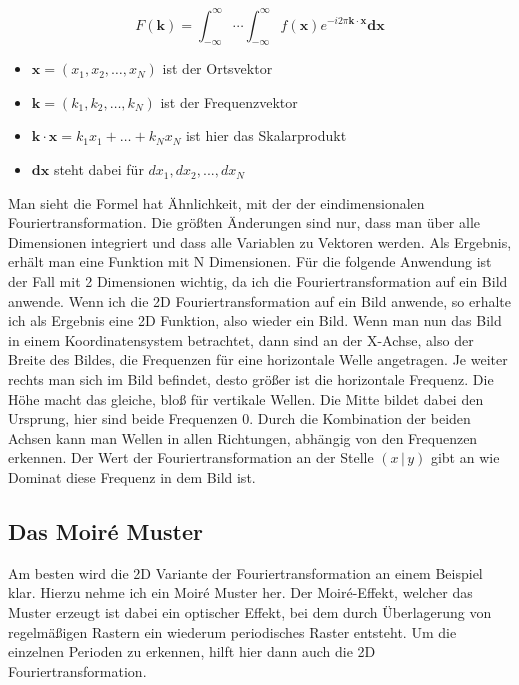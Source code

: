 \documentclass[a4paper,12pt]{article}
\theoremstyle{definition}
\theoremstyle{remark}
\begin{document}
$$F(\mathbf{k}) = \int_{-\infty}^{\infty} \cdots \int_{-\infty}^{\infty} {f(\mathbf{x}) e^{-i2\pi \mathbf{k} \cdot \mathbf{x}} \mathbf{dx}}$$
\begin{itemize}
  \item $\mathbf{x} = (x_1, x_2, \ldots, x_N)$ ist der Ortsvektor
  \item $\mathbf{k} = (k_1, k_2, \ldots, k_N)$ ist der Frequenzvektor
  \item $\mathbf{k} \cdot \mathbf{x} = k_1x_1 + \dots + k_Nx_N$ ist hier das Skalarprodukt
  \item $\mathbf{dx}$ steht dabei für $dx_1, dx_2, ..., dx_N$
\end{itemize}

Man sieht die Formel hat Ähnlichkeit, mit der der eindimensionalen Fouriertransformation. Die größten Änderungen sind nur, dass man über alle 
Dimensionen integriert und dass alle Variablen zu Vektoren werden. Als Ergebnis, erhält man eine Funktion mit N Dimensionen. Für die folgende 
Anwendung ist der Fall mit 2 Dimensionen wichtig, da ich die Fouriertransformation auf ein Bild anwende. Wenn ich die 2D Fouriertransformation 
auf ein Bild anwende, so erhalte ich als Ergebnis eine 2D Funktion, also wieder ein Bild. Wenn man nun das Bild in einem Koordinatensystem betrachtet,
dann sind an der X-Achse, also der Breite des Bildes, die Frequenzen für eine horizontale Welle angetragen. Je weiter rechts man sich im Bild befindet,
desto größer ist die horizontale Frequenz. Die Höhe macht das gleiche, bloß für vertikale Wellen. Die Mitte bildet dabei den Ursprung, hier sind beide 
Frequenzen 0. Durch die Kombination der beiden Achsen kann man Wellen in allen Richtungen, abhängig von den Frequenzen erkennen. Der Wert der 
Fouriertransformation an der Stelle $(x\,|\,y)$ gibt an wie Dominat diese Frequenz in dem Bild ist. 
\subsection{Das Moiré Muster}
Am besten wird die 2D Variante der Fouriertransformation an einem Beispiel klar. Hierzu nehme ich ein Moiré Muster her. Der Moiré-Effekt, welcher 
das Muster erzeugt ist dabei ein optischer Effekt, bei dem durch Überlagerung von regelmäßigen Rastern ein wiederum periodisches Raster entsteht.
Um die einzelnen Perioden zu erkennen, hilft hier dann auch die 2D Fouriertransformation.
\end{document}
